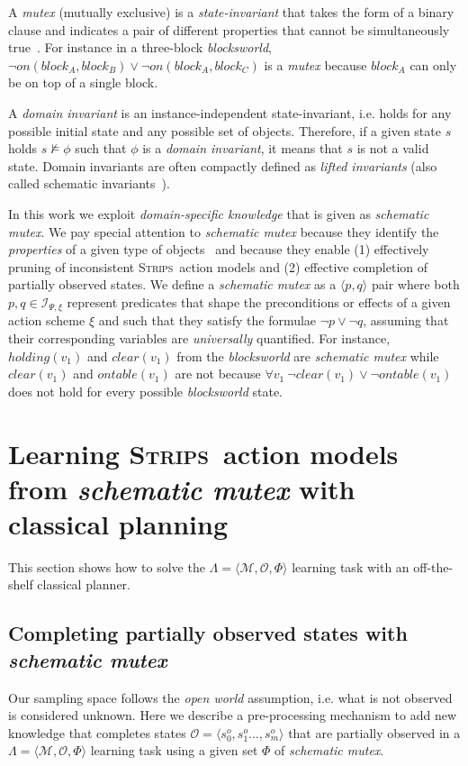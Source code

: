 \documentclass{article}
\newcommand{\tup}[1]{{\langle #1 \rangle}}
\newcommand{\strips}{\textsc{Strips}}
\begin{document}
A {\em mutex} (mutually exclusive) is a {\em state-invariant} that takes the form of a binary clause and indicates a pair of different properties that cannot be simultaneously true~\cite{kautz:mutex:IJCAI1999}. For instance in a three-block {\em blocksworld}, $\neg on(block_A,block_B)\vee \neg on(block_A,block_C)$ is a {\em mutex} because $block_A$ can only be on top of a single block.

A {\em domain invariant} is an instance-independent state-invariant, i.e. holds for any possible initial state and any possible set of objects. Therefore, if a given state $s$ holds $s\nvDash \phi$ such that $\phi$ is a {\em domain invariant}, it means that $s$ is not a valid state. Domain invariants are often compactly defined as {\em lifted invariants} (also called schematic invariants~\cite{rintanen:schematicInvariants:AAAI2017}).

In this work we exploit {\em domain-specific knowledge} that is given as  {\em schematic mutex}. We pay special attention to {\em schematic mutex} because they identify the {\em properties} of a given type of objects~\cite{fox:TIM:JAIR1998} and because they enable (1) effectively pruning of inconsistent \strips\ action models and (2) effective completion of partially observed states.  We define a {\em schematic mutex} as a $\tup{p,q}$ pair where both $p,q\in{\mathcal I}_{\Psi,\xi}$ represent predicates that shape the preconditions or effects of a given action scheme $\xi$ and such that they satisfy the formulae $\neg p\vee \neg q$, assuming that their corresponding variables are {\em universally} quantified. For instance, $holding(v_1)$ and $clear(v_1)$ from the {\em blocksworld} are {\em schematic mutex} while $clear(v_1)$ and $ontable(v_1)$ are not because $\forall v_1\ \neg clear(v_1)\vee\neg ontable(v_1)$ does not hold for every possible {\em blocksworld} state. 



\section{Learning \strips\ action models from {\em schematic mutex} with classical planning}
\label{sec:compilation}
This section shows how to solve the $\Lambda=\tup{\mathcal{M},{\mathcal O},\Phi}$ learning task with an off-the-shelf classical planner.

\subsection{Completing partially observed states with {\em schematic mutex}}
Our sampling space follows the {\em open world} assumption, i.e. what is not observed is considered unknown. Here we describe a pre-processing mechanism to add new knowledge that completes states $\mathcal{O}=\tup{s_0^o,s_1^o \ldots, s_m^o}$ that are partially observed in a $\Lambda=\tup{\mathcal{M},{\mathcal O},\Phi}$ learning task using a given set $\Phi$ of {\em schematic mutex}. 
\end{document}
